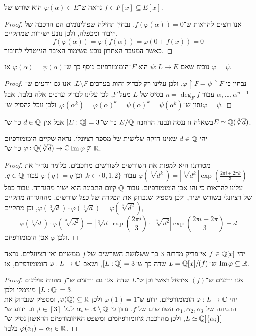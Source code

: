 \subquestion{}
נראה ש־$\varphi(\alpha) \in E$ הוא שורש של $f \in F[x] \subseteq E[x]$.
\begin{proof}
	אנו רוצים להראות ש־$f(\varphi(\alpha)) = 0$.
	נבחין תחילה שפולינומים הם הרכבה של חיבור ומכפלה, ולכן נובע ישירות שמתקיים,
	\[
		f(\varphi(\alpha)) = \varphi(f(\alpha)) = \varphi(0 + f(x)) = 0
	\]
	כאשר המעבר האחרון נובע משימור האיבר הנייטרלי לחיבור.
\end{proof}

\subquestion{}
נוכיח שאם $\psi : L \to E$ הוא $F$־הומומורפיזם נוסף כך ש־$\varphi(\alpha) = \psi(\alpha)$ אז $\varphi = \psi$.
\begin{proof}
	נבחין כי $\varphi \restriction F = \psi \restriction F$, ולכן עלינו רק לבדוק זהות בערכים $L \setminus F$.
	אנו גם יודעים ש־$\alpha, \ldots, \alpha^{n - 1}$ עבור $n = \deg_F f$ בסיס של $L$ מעל $F$, לכן עלינו לבדוק ערכים אלה בלבד.
	אבל נתון ש־$\varphi(\alpha^k) = {\varphi(\alpha)}^k = {\psi(\alpha)}^k = \psi(\alpha^k)$, ולכן נוכל להסיק ש־$\varphi = \psi$.
\end{proof}

\question{}
בשאלה זו ננסה ונבנה הרחבה $E / \mathbb{Q}$ כך ש־$[E : \mathbb{Q}] = 3$ אבל אין $d \in \mathbb{Q}$ כך ש־$E \simeq \mathbb{Q}(\sqrt[3]{d})$.

\subquestion{}
יהי $d \in \mathbb{Q}$ שאינו חזקה שלישית של מספר רציונלי, נראה שקיים הומומורפיזם  $\varphi : \mathbb{Q}(\sqrt[3]{d}) \to \mathbb{C}$ כך ש־$\operatorname{Im} \varphi \not\subseteq \mathbb{R}$.
\begin{proof}
	מטרתנו היא למפות את השורשים לשורשים מרוכבים.
	כלומר נגדיר את $\varphi(\sqrt[3]{d^k}) = |\sqrt[3]{d^k}| \exp(\frac{2\pi i + 2\pi k}{3})$ עבור $k \in \{0, 1, 2\}$, וכן $\varphi(q) = q$ עבור $q \in \mathbb{Q}$.
	עלינו להראות כי זהו אכן הומומורפיזם.
	עבור $\mathbb{Q}$ קיום התכונה הוא ישיר מהגדרה.
	עבור כפל של רציונלי בשורש ישיר, ולכן מספיק שנבדוק את המקרה של כפל שורשים.
	מההגדרה מתקיים $\varphi(\sqrt[3]{d}) \cdot \varphi(\sqrt[3]{d}) = \varphi(\sqrt[3]{d^2})$, וכן מתקיים,
	\[
		\varphi(\sqrt[3]{d}) \cdot \varphi(\sqrt[3]{d^2})
		= |\sqrt[3]{d}| \exp(\frac{2\pi i}{3}) \cdot |\sqrt[3]{d^2}| \exp(\frac{2\pi i + 2\pi}{3})
		= d
	\]
	ולכן $\varphi$ אכן הומומורפיזם.
\end{proof}

\subquestion{}
יהי $f \in \mathbb{Q}[x]$ אי־פריק מדרגה 3 כך ששלושת השורשים של $f$ ממשיים ואי־רציונליים.
נראה ש־$L = \mathbb{Q}[x] / (f)$ שדה כך ש־$[L : \mathbb{Q}] = 3$, ושאם $\varphi : L \to \mathbb{C}$ הומומורפיזם, אז $\operatorname{Im} \varphi \subseteq \mathbb{R}$.
\begin{proof}
	אנו יודעים ש־$(f)$ אידאל ראשי וכן ש־$L$ שדה.
	אנו גם יודעים ש־$f$ מהווה פולינום מינימלי ולכן $[L : \mathbb{Q}] = 3$. \\
	יהי $\varphi : L \to \mathbb{C}$ הומומורפיזם.
	ידוע ש־$\varphi(1) = 1$ ולכן $\varphi(\mathbb{Q}) \subseteq \mathbb{R}$, ומספיק שנבדוק את התמונה של $\alpha_1, \alpha_2, \alpha_3$ השורשים של $f$.
	נתון כי $\alpha_i \in \mathbb{R} \setminus \mathbb{Q}$ לכל $i \in [3]$, וכן ידוע ש־$L \simeq \mathbb{Q}[\{ \alpha_i \}]$, ולכן מהרכבת איזומורפיזמים ומשפט האיזומורפיזם הראשון נסיק ש־$\varphi(\alpha_i) = \alpha_i \in \mathbb{R}$ בלבד.
\end{proof}

